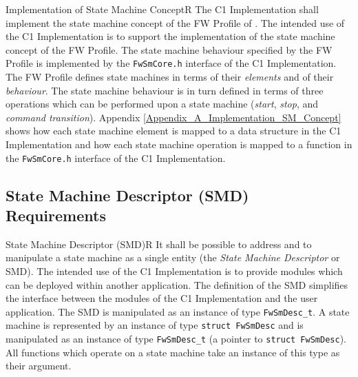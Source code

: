 \documentclass[requirements]{../fwprofile}
\begin{document}
\begin{fw_req}{Implementation of State Machine Concept}{R}
{The C1 Implementation shall implement the state machine concept of the FW Profile of \cite{ref:fwprofile}.}
{The intended use of the C1 Implementation is to support the implementation of the state machine concept of the FW Profile.}
{The state machine behaviour specified by the FW Profile is implemented 
by the \texttt{FwSmCore.h} interface of the C1 Implementation.} 
{The FW Profile defines state machines in terms of their \emph{elements} 
and of their \emph{behaviour}. 
The state machine behaviour is in turn defined in terms of three operations which can be performed 
upon a state machine (\textit{start}, \textit{stop}, and \textit{command transition}).
Appendix \ref{Appendix_A_Implementation_SM_Concept} shows how each state machine element is 
mapped to a data structure in the C1 Implementation and how each state machine operation is 
mapped to a function in the \texttt{FwSmCore.h} interface of the C1 Implementation.}
\end{fw_req}

\subsection{State Machine Descriptor (SMD) Requirements}\label{req:SMD}

\begin{fw_req}{State Machine Descriptor (SMD)}{R}
{It shall be possible to address and to manipulate a state machine 
as a single entity (the \emph{State Machine Descriptor} or SMD).}
{The intended use of the C1 Implementation is to provide modules 
which can be deployed within another application. 
The definition of the SMD simplifies the interface between the modules of the C1 Implementation 
and the user application.}
{The SMD is manipulated as an instance of type \texttt{FwSmDesc\_t}.} 
{A state machine is represented by an instance of type 
\texttt{struct FwSmDesc} and is manipulated as an instance of type 
\texttt{FwSmDesc\_t} (a pointer to \texttt{struct FwSmDesc}).
All functions which operate on a state machine take an instance of this type as their argument.}
\end{fw_req}
\end{document}
